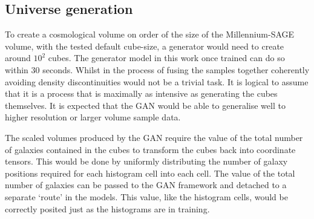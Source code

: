 \documentclass[twocolumn]{article}
\numberwithin{equation}{section}
\begin{document}
\subsection{Universe generation} To create a cosmological volume on order of the size of the Millennium-SAGE volume, with the tested default cube-size, a generator would need to create around $10^2$ cubes. The generator model in this work once trained can do so within 30 seconds. Whilst in the process of fusing the samples together coherently avoiding density discontinuities would not be a trivial task. It is logical to assume that it is a process that is maximally as intensive as generating the cubes themselves. It is expected that the GAN would be able to generalise well to higher resolution or larger volume sample data.  

The scaled volumes produced by the GAN require the value of the total number of galaxies contained in the cubes to transform the cubes back into coordinate tensors. This would be done by uniformly distributing the number of galaxy positions required for each histogram cell into each cell. The value of the total number of galaxies can be passed to the GAN framework and detached to a separate `route' in the models. This value, like the histogram cells, would be correctly posited just as the histograms are in training. 


\end{document}
